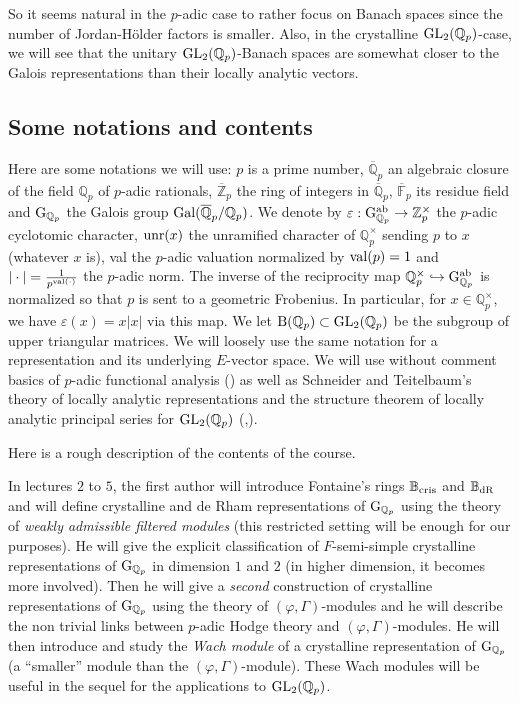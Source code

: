 \documentclass[11pt]{amsart}
\def\Z{{\mathbb Z}_p}
\def\Q{{\mathbb Q}_p}
\def\F{{\mathbb F}_p}
\def\g{{\rm G}_{\Q}}
\def\G{{\rm GL}_2(\Q)}
\def\B{{\rm B}(\Q)}
\def\bcris{\mathbb{B}_{\rm cris}}
\def\bdR{\mathbb{B}_{\rm dR}}
\begin{document}
So it seems natural in the $p$-adic case to rather focus on Banach
spaces since the number of Jordan-H\"older factors is smaller. Also,
in the crystalline $\G$-case, we will see that the unitary $\G$-Banach
spaces are somewhat closer to the Galois representations than their
locally analytic vectors. 

\subsection{Some notations and contents} 
Here are some notations we will use: $p$ is a prime number,
$\overline\Q$ an algebraic closure of the field $\Q$ of $p$-adic
rationals, $\overline\Z$ the ring of integers in $\overline\Q$,
$\overline\F$ its residue field and $\g$ the Galois group ${\rm
  Gal}(\overline\Q/\Q)$. We denote by $\varepsilon : \g^{\rm
  ab}\rightarrow \Z^{\times}$ the $p$-adic cyclotomic character, ${\rm
  unr}(x)$ the unramified character of $\Q^{\times}$ sending $p$ to
$x$ (whatever $x$ is), val the $p$-adic valuation normalized by ${\rm
  val}(p)=1$ and $|\cdot|=\frac{1}{p^{{\rm val}(\cdot)}}$ the $p$-adic
norm. The inverse of the reciprocity map $\Q^{\times}\hookrightarrow
\g^{\rm ab}$ is normalized so that $p$ is sent to a geometric
Frobenius. In particular, for $x\in \Q^{\times}$, we have
$\varepsilon(x)=x|x|$ via this map. We let $\B\subset \G$ be the
subgroup of upper triangular matrices. We will loosely use the same
notation for a representation and its underlying $E$-vector space. We
will use without comment basics of $p$-adic functional analysis
(\cite{Schn}) as well as Schneider and Teitelbaum's theory of locally
analytic representations and the structure theorem of locally analytic
principal series for $\G$ (\cite{ST1},\cite{ST2}).

Here is a rough description of the contents of the course.

In lectures $2$ to $5$, the first author will introduce Fontaine's
rings $\bcris$ and $\bdR$ and will define crystalline and de Rham
representations of $\g$ using the theory of {\it weakly admissible
  filtered modules} (this restricted setting will be enough for our
purposes). He will give the explicit classification of $F$-semi-simple
crystalline representations of $\g$ in dimension $1$ and $2$ (in
higher dimension, it becomes more involved). Then he will give a {\it
  second} construction of crystalline representations of $\g$ using
the theory of $(\varphi,\Gamma)$-modules and he will describe the non
trivial links between $p$-adic Hodge theory and
$(\varphi,\Gamma)$-modules. He will then introduce and study the {\it
  Wach module} of a crystalline representation of $\g$ (a ``smaller''
module than the $(\varphi,\Gamma)$-module). These Wach modules will be
useful in the sequel for the applications to $\G$.
\end{document}
